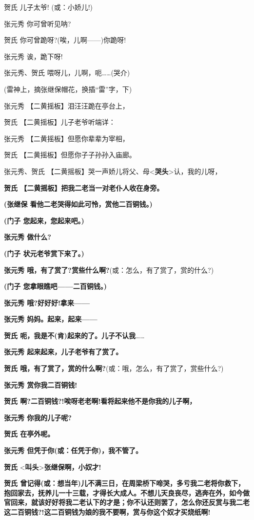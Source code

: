 贺氏 儿子太爷! (或：小娇儿!)

张元秀 你可曾听见呐?

贺氏 你可曾跪呀?(唉，儿啊------)你跪呀!

张元秀 诶，跪下呀!

张元秀、贺氏 喂呀儿，儿啊，呃\ldots{}\ldots{}(哭介)

(雷神上，摘张继保帽花，换插``雷''字，下)

张元秀 【二黄摇板】泪汪汪跪在亭台上，

贺氏 【二黄摇板】儿子老爷听端详：

张元秀 【二黄摇板】但愿你辈辈为宰相，

贺氏 【二黄摇板】但愿你子子孙孙入庙廊。

张元秀、贺氏
【二黄摇板】哭一声娇儿将父、母\textless{}\textbf{哭头}\textgreater{}认，我的儿呀，

\textbf{贺氏 【二黄摇板】把我二老当一对老仆人收在身旁。}

\textbf{(张继保 看他二老哭得如此可怜，赏他二百铜钱。)}

\textbf{(门子 您起来，您起来吧。)}

\textbf{张元秀 做什么?}

\textbf{(门子 状元老爷赏下来了。)}

\textbf{张元秀 哦，有了赏了?赏些什么啊?}(或：怎么，有了赏了，赏的什么?)

\textbf{(门子 您拿眼瞧吧------二百铜钱。)}

\textbf{张元秀 哦?好好好!拿来------}

\textbf{张元秀 妈妈。起来，起来------}

\textbf{贺氏 呃，我是不(肯)起来的了。儿子不认我}\ldots{}\ldots{}

\textbf{张元秀 起来起来，儿子老爷有了赏了。}

\textbf{贺氏
哦，有了赏了，赏的什么啊?}(或：哦，怎么，有了赏了，赏些什么?)

\textbf{张元秀 赏你我二百铜钱!}

\textbf{贺氏 啊?二百铜钱?!唉呀老老啊!看将起来他不是你我的儿子啊，}

\textbf{张元秀 你我的儿子呢?}

\textbf{贺氏 在亭外呢。}

\textbf{张元秀 但凭于你(或：任凭于你)，我不管了。}

\textbf{贺氏}
\textless{}\textbf{叫头}\textgreater{}\textbf{张继保啊，小奴才!}

\textbf{贺氏
曾记得(或：想当年)儿不满三日，在周梁桥下啼哭，多亏我二老将你救下，抱回家去，抚养儿一十三载，才得长大成人。不想儿天良丧尽，逃奔在外，如今做官回来，就该好好将我二老认下的才是；你不认还则罢了，怎么你还反赏与我二老这二百铜钱?!这二百铜钱为娘的我不要啊，赏与你这个奴才买烧纸啊!}


